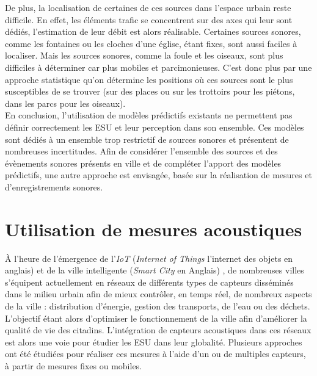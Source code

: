 De plus, la localisation de certaines de ces sources dans l'espace urbain reste difficile. En effet, les éléments trafic se concentrent sur des axes qui leur sont dédiés, l'estimation de leur débit est alors réalisable. Certaines sources sonores, comme les fontaines ou les cloches d'une église, étant fixes, sont aussi faciles à localiser. Mais les sources sonores, comme la foule et les oiseaux, sont plus difficiles à déterminer car plus mobiles et parcimonieuses. C'est donc plus par une approche statistique qu'on détermine les positions où ces sources sont le plus susceptibles de se trouver (sur des places ou sur les trottoirs pour les piétons, dans les parcs pour les oiseaux).\\

En conclusion, l'utilisation de modèles prédictifs existants ne permettent pas définir correctement les ESU et leur perception dans son ensemble. Ces modèles sont dédiés à un ensemble trop restrictif de sources sonores et présentent de nombreuses incertitudes. Afin de considérer l'ensemble des sources et des évènements sonores présents en ville et de compléter l'apport des modèles prédictifs, une autre approche est envisagée, basée sur la réalisation de mesures et d'enregistrements sonores.


\section{Utilisation de mesures acoustiques}

À l'heure de l'émergence de l'\textit{IoT} (\textit{Internet of Things} l'internet des objets en anglais) \cite{zanella2014internet} et de la ville intelligente (\textit{Smart City} en Anglais) \cite{chourabi2012understanding}, de nombreuses villes s'équipent actuellement en réseaux de différents types de capteurs disséminés dans le milieu urbain afin de mieux contrôler, en temps réel, de nombreux aspects de la ville : distribution d'énergie, gestion des transports, de l’eau ou des déchets. L'objectif étant alors d'optimiser le fonctionnement de la ville afin d'améliorer la qualité de vie des citadins.
L'intégration de capteurs acoustiques dans ces réseaux est alors une voie pour étudier les ESU dans leur globalité. Plusieurs approches ont été étudiées pour réaliser ces mesures à l'aide d'un ou de multiples capteurs, à partir de mesures fixes ou mobiles.

